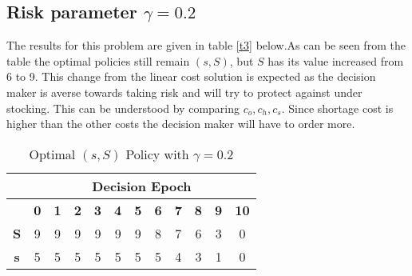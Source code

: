 \documentclass[11pt,a4paper,oneside]{report}
\begin{document}
\subsection{Risk parameter $\gamma= 0.2$}
The results for this problem are given in table \ref{t3} below.As can be seen from the table the optimal policies still remain $(s,S)$, but $S$ has its value increased from 6 to 9. This change from the linear cost solution is expected as the decision maker is averse towards taking risk and will try to protect against under stocking. This can be understood by comparing $c_o, c_h, c_s$. Since shortage cost is higher than the other costs the decision maker will have to order more. 
\begin{table}[h]
\centering
\caption{Optimal $(s,S)$ Policy with $\gamma=0.2$}
\label{t7}
\begin{tabular}{|c|c|c|c|c|c|c|c|c|c|c|c|}
\hline
           & \multicolumn{11}{c|}{\textbf{Decision Epoch}}                                                                                                 \\ \hline
           & \textbf{0} & \textbf{1} & \textbf{2} & \textbf{3} & \textbf{4} & \textbf{5} & \textbf{6} & \textbf{7} & \textbf{8} & \textbf{9} & \textbf{10} \\ \hline
\textbf{S} & 9          & 9          & 9          & 9          & 9          & 9          & 8          & 7          & 6          & 3          & 0           \\ \hline
\textbf{s} & 5          & 5          & 5          & 5          & 5          & 5          & 5          & 4          & 3          & 1          & 0           \\ \hline
\end{tabular}
\end{table}
\end{document}
